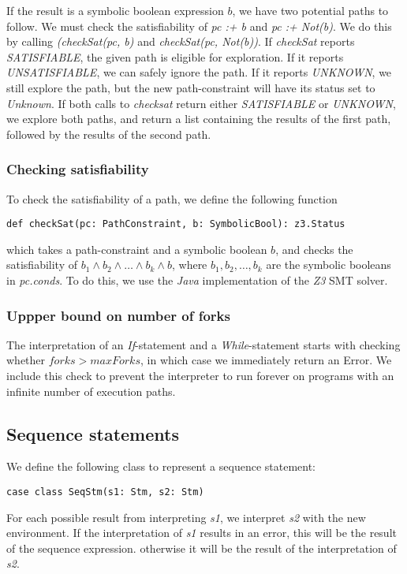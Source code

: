 \noindent If the result is a symbolic boolean expression $b$, we have two potential paths to follow. We must check the satisfiability of \textsl{pc :+ b} and \textsl{pc :+ Not(b)}. We do this by calling \textsl{(checkSat(pc, b)} and \textsl{checkSat(pc, Not(b))}. If \textsl{checkSat} reports \textsl{SATISFIABLE}, the given path is eligible for exploration. If it reports \textsl{UNSATISFIABLE}, we can safely ignore the path. If it reports \textsl{UNKNOWN}, we still explore the path, but the new path-constraint will have its status set to \textsl{Unknown}.
 If both calls to \textsl{checksat} return either \textsl{SATISFIABLE} or \textsl{UNKNOWN}, we explore both paths, and return a list containing the results of the first path, followed by the results of the second path.

\subsubsection{Checking satisfiability}
To check the satisfiability of a path, we define the following function

\begin{lstlisting}[style=simple]
def checkSat(pc: PathConstraint, b: SymbolicBool): z3.Status
\end{lstlisting}
which takes a path-constraint and a symbolic boolean $b$, and checks the satisfiability of $b_1 \land b_2 \land \ldots \land b_k \land b$, where $b_1, b_2, \ldots, b_k$ are the symbolic booleans in \textsl{pc.conds}. To do this, we use the \textsl{Java} implementation of the \textsl{Z3} SMT solver. 
 
\subsubsection{Uppper bound on number of forks}

The interpretation of an \textsl{If}-statement and a \textsl{While}-statement starts with checking whether $forks > maxForks$, in which case we immediately return an Error. We include this check to prevent the interpreter to run forever on programs with an infinite number of execution paths. 

\iffalse
\subsection{Sequence statements}

We define the following class to represent a sequence statement:
\begin{lstlisting}[style=simple]
	case class SeqStm(s1: Stm, s2: Stm)
\end{lstlisting}
For each possible result from interpreting \textsl{s1}, we interpret \textsl{s2} with the new environment. If the interpretation of \textsl{s1} results in an error, this will be the result of the sequence expression. otherwise it will be the result of the interpretation of \textsl{s2}. 	

